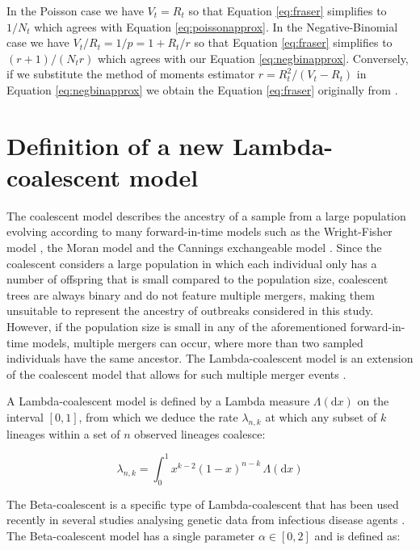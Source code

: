 \documentclass{article}
\renewcommand{\eqref}[1]{\ref{#1}}
\begin{document}
In the Poisson case we have $V_t=R_t$ so that Equation \eqref{eq:fraser} simplifies to $1/N_t$ which agrees with Equation \eqref{eq:poissonapprox}. 
In the Negative-Binomial case we have $V_t/R_t=1/p=1+R_t/r$ so that Equation \eqref{eq:fraser}
simplifies to $(r+1)/(N_t r)$ which agrees with our Equation \eqref{eq:negbinapprox}. 
Conversely, if we substitute the method of moments estimator 
$r=R_t^2/(V_t-R_t)$
in Equation \eqref{eq:negbinapprox} we obtain the Equation \eqref{eq:fraser}
originally from \citet{Fraser2017}. 

\section{Definition of a new Lambda-coalescent model}

The coalescent model \citep{Kingman1982,Kingman1982a} describes the ancestry of a sample from a large population 
evolving according to many forward-in-time models such as the Wright-Fisher model \citep{Wright1931,Fisher1930}, 
the Moran model \citep{Moran1958} and the Cannings exchangeable model \citep{Cannings1974}.
Since the coalescent considers a large population in which each individual only has a number of offspring that is small
compared to the population size, coalescent trees are always binary and do not feature multiple mergers,
making them unsuitable to represent the ancestry of outbreaks considered in this study.
However, if the population size is small in any of the aforementioned forward-in-time
models, multiple mergers can occur, where more than two sampled individuals
have the same ancestor. 
The Lambda-coalescent model is an extension of the coalescent model that 
allows for such multiple merger events
\citep{pitmanCoalescentsMultipleCollisions1999,sagitovGeneralCoalescentAsynchronous1999,donnellyParticleRepresentationsMeasureValued1999}. 

A Lambda-coalescent model is defined by a Lambda measure 
$\Lambda(\mathrm{d} x)$ on the interval $[0,1]$, from which we deduce
the rate $\lambda_{n,k}$ at which any subset of $k$ lineages within a set of $n$ observed lineages 
coalesce:

\begin{equation}
    \lambda_{n,k} = \int_{0}^{1}{x^{k-2}(1-x)^{n-k}\,\Lambda(\mathrm{d} x)}\label{eq:lambda}
\end{equation}

The Beta-coalescent \citep{schweinsbergCoalescentProcessesObtained2003} is a 
specific type of Lambda-coalescent that has been used recently in several studies
analysing genetic data from infectious disease agents \citep{Hoscheit2019,Menardo2021,Helekal2024,zhangMultipleMergerCoalescent2024}.
The Beta-coalescent model 
has a single parameter $\alpha \in [0,2]$ and is defined as:
\end{document}
